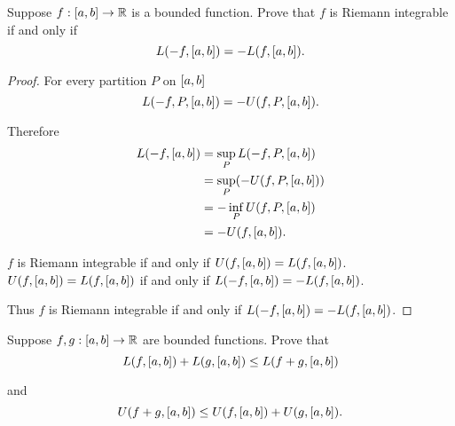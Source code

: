 \begin{exercise}\label{chapter1:sectionB:exercise2}
    Suppose $f: \left[{a,b}\right]\to\mathbb{R}$ is a bounded function. Prove that $f$ is Riemann integrable if and only if
    \[
        L(-f, \left[{a,b}\right]) = -L(f, \left[{a,b}\right]).
    \]
\end{exercise}

\begin{proof}
    For every partition $P$ on $\left[{a, b}\right]$
    \[
        L(-f, P, \left[{a, b}\right]) = -U(f, P, \left[{a, b}\right]).
    \]

    Therefore
    \begin{align*}
        L(-f, \left[{a, b}\right]) & = \sup\limits_{P}L(-f, P, \left[{a, b}\right])   \\
                                     & = \sup\limits_{P}(-U(f, P, \left[{a, b}\right])) \\
                                     & = -\inf\limits_{P}U(f, P, \left[{a, b}\right])   \\
                                     & = -U(f, \left[{a, b}\right]).
    \end{align*}

    $f$ is Riemann integrable if and only if $U(f, \left[{a, b}\right]) = L(f, \left[{a, b}\right])$. $U(f, \left[{a, b}\right]) = L(f, \left[{a, b}\right])$ if and only if $L(-f, \left[{a, b}\right]) = -L(f, \left[{a, b}\right])$.

    Thus $f$ is Riemann integrable if and only if $L(-f, \left[{a, b}\right]) = -L(f, \left[{a, b}\right])$.
\end{proof}
\newpage

\begin{exercise}\label{chapter1:sectionB:exercise3}
    Suppose $f, g: \left[{a,b}\right]\to\mathbb{R}$ are bounded functions. Prove that
    \[
        L(f, \left[{a,b}\right]) + L(g, \left[{a,b}\right]) \leq L(f + g, \left[{a,b}\right])
    \]

    and
    \[
        U(f + g, \left[{a,b}\right]) \leq U(f, \left[{a,b}\right]) + U(g, \left[{a, b}\right]).
    \]
\end{exercise}

